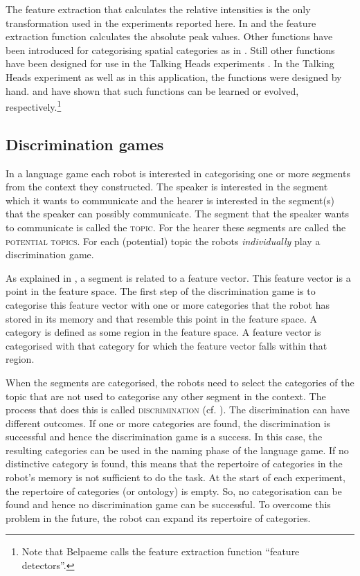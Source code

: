 The feature extraction that calculates the relative intensities is the only transformation used in the experiments reported here. In \citealt{steelsvogt:1997} and \citealt{vogt:1998b} the feature extraction function calculates the absolute peak values. Other functions have been introduced for categorising spatial categories as in \citealt{steels:1996d}. Still other functions have been designed for use in the Talking Heads experiments \citep{belpaeme:1998,steelskaplan:1999}. In the Talking Heads experiment as well as in this application, the functions were designed by hand. \citet{dejong:1999} and \citet{belpaeme:1999} have shown that such functions can be learned or evolved, respectively.\footnote{Note that Belpaeme calls the feature extraction function ``feature detectors''.}

\subsection{Discrimination games}\label{s:cm:dg}
In a language game each robot is interested in categorising one or more segments from the context they constructed. The speaker is interested in the segment which it wants to communicate and the hearer is interested in the segment(s) that the speaker can possibly communicate. The segment that the speaker wants to communicate is called the {\scshape topic}. For the hearer these segments are called the {\scshape potential topics}. For each (potential) topic the robots {\em individually} play a discrimination game.

As explained in , a segment is related to a feature vector. This feature vector is a point in the feature space. The first step of the discrimination game is to categorise this feature vector with one or more categories that the robot has stored in its memory and that resemble this point in the feature space. A category is defined as some region in the feature space. A feature vector is categorised with that category for which the feature vector falls within that region.

When the segments are categorised, the robots need to select the categories of the topic that are not used to categorise any other segment in the context. The process that does this is called {\scshape discrimination} (cf. \citealt{steels:1996b}). The discrimination can have different outcomes. If one or more categories are found, the discrimination is successful and hence the discrimination game is a success. In this case, the resulting categories can be used in the naming phase of the language game. If no distinctive category is found, this means that the repertoire of categories in the robot's memory is not sufficient to do the task.  At the start of each experiment, the repertoire of categories (or ontology) is empty. So, no categorisation can be found and hence no discrimination game can be successful. To overcome this problem in the future, the robot can expand its repertoire of categories.

